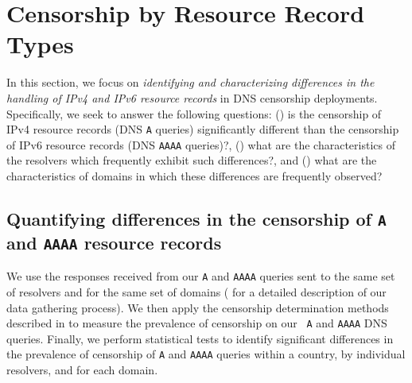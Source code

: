 \section{Censorship by Resource Record Types} \label{sec:resources}

In this section, we focus on {\it identifying and characterizing differences in
the handling of IPv4 and IPv6 resource records} in DNS censorship deployments.
Specifically, we seek to answer the following questions: 
%
() is the censorship of IPv4 resource records (DNS
{\tt A} queries) significantly different than the censorship of IPv6 resource
records (DNS {\tt AAAA} queries)?,
%
() what are the characteristics of the resolvers
which frequently exhibit such differences?, and
%
() what are the characteristics of domains in which
these differences are frequently observed?
%

\subsection{Quantifying differences in the censorship of \texttt{A} and
\texttt{AAAA} resource records} \label{sec:resources:sig}
%
We use the responses received from our {\tt A} and {\tt AAAA} queries sent to
the same set of resolvers and for the same set of domains (\cf
{} for a detailed description of our data gathering
process). We then apply the censorship determination methods described in
 to measure the prevalence of censorship on our {\tt
A} and {\tt AAAA} DNS queries. Finally, we perform statistical tests to
identify significant differences in the prevalence of censorship of {\tt A} and
{\tt AAAA} queries within a country, by individual resolvers, and for each
domain. 


